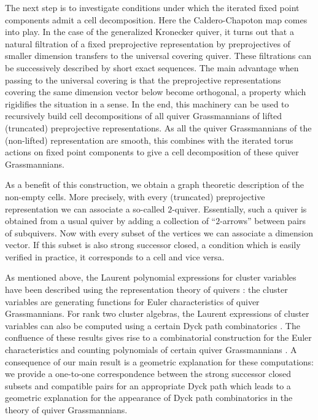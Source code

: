 \documentclass[smallextended,envcountsect,envcountsame]{svjour3}
\numberwithin{equation}{section}
\begin{document}
The next step is to investigate conditions under which the iterated fixed point components admit a cell decomposition.
Here the Caldero-Chapoton map comes into play.
In the case of the generalized Kronecker quiver, it turns out that a natural filtration of a fixed preprojective representation by preprojectives of smaller dimension transfers to the universal covering quiver.
These filtrations can be successively described by short exact sequences.
The main advantage when passing to the universal covering is that the preprojective representations covering the same dimension vector below become orthogonal, a property which rigidifies the situation in a sense.
In the end, this machinery can be used to recursively build cell decompositions of all quiver Grassmannians of lifted (truncated) preprojective representations.
As all the quiver Grassmannians of the (non-lifted) representation are smooth, this combines with the iterated torus actions on fixed point components to give a cell decomposition of these quiver Grassmannians.

As a benefit of this construction, we obtain a graph theoretic description of the non-empty cells.
More precisely, with every (truncated) preprojective representation we can associate a so-called $2$-quiver.
Essentially, such a quiver is obtained from a usual quiver by adding a collection of ``$2$-arrows'' between pairs of subquivers.
Now with every subset of the vertices we can associate a dimension vector.
If this subset is also strong successor closed, a condition which is easily verified in practice, it corresponds to a cell and vice versa.

As mentioned above, the Laurent polynomial expressions for cluster variables have been described using the representation theory of quivers \cite{cc,ck}: the cluster variables are generating functions for Euler characteristics of quiver Grassmannians.
For rank two cluster algebras, the Laurent expressions of cluster variables can also be computed using a certain Dyck path combinatorics \cite{llz}.
The confluence of these results gives rise to a combinatorial construction for the Euler characteristics and counting polynomials of certain quiver Grassmannians \cite{rupel}.
A consequence of our main result is a geometric explanation for these computations: we provide a one-to-one correspondence between the strong successor closed subsets and compatible pairs for an appropriate Dyck path which leads to a geometric explanation for the appearance of Dyck path combinatorics in the theory of quiver Grassmannians. 
\end{document}

